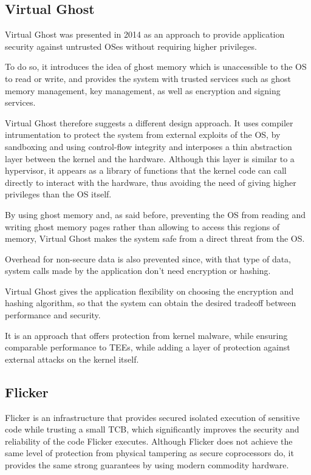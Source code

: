 \subsection{Virtual Ghost}
\label{ssec:virtghost}

Virtual Ghost was presented in 2014 \cite{virtGhostPaper} as an approach to provide application security against untrusted OSes without requiring higher privileges. 

To do so, it introduces the idea of ghost memory which is unaccessible to the OS to read or write, and provides the system with trusted services such as ghost memory management, key management, as well as encryption and signing services. 

Virtual Ghost therefore suggests a different design approach.
It uses compiler intrumentation to protect the system from external exploits of the OS, by sandboxing and using control-flow integrity and interposes a thin abstraction layer between the kernel and the hardware. Although this layer is similar to a hypervisor, it appears as a library of functions that the kernel code can call directly to interact with the hardware, thus avoiding the need of giving higher privileges than the OS itself. 

By using ghost memory and, as said before, preventing the OS from reading and writing ghost memory pages rather than allowing to access this regions of memory, Virtual Ghost makes the system safe from a direct threat from the OS.

Overhead for non-secure data is also prevented since, with that type of data, system calls made by the application don't need encryption or hashing.

Virtual Ghost gives the application flexibility on choosing the encryption and hashing algorithm, so that the system can obtain the desired tradeoff between performance and security.

It is an approach that offers protection from kernel malware, while ensuring comparable performance to TEEs, while adding a layer of protection against external attacks on the kernel itself.



\subsection{Flicker}
\label{ssec:flicker}

Flicker \cite{flickerPaper} is an infrastructure that provides secured isolated execution of sensitive code while trusting a small TCB, which significantly improves the security and reliability of the code Flicker executes. Although Flicker does not achieve the same level of protection from physical tampering as secure coprocessors do, it provides the same strong guarantees by using modern commodity hardware.


